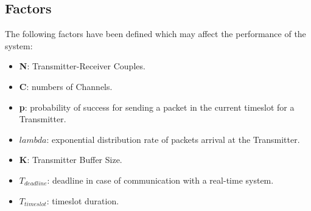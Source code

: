 \subsection{Factors}
The following factors have been defined which may affect the performance of the system:
\begin{itemize}
	\item \textbf{N}: Transmitter-Receiver Couples.
	\item \textbf{C}: numbers of Channels.
	\item \textbf{p}: probability of success for sending a packet in the current timeslot for a Transmitter.
	\item \textbf{$lambda$}: exponential distribution rate of packets arrival at the Transmitter.
	\item \textbf{K}: Transmitter Buffer Size.
	\item $T_{deadline}$: deadline in case of communication with a real-time system.
	\item $T_{timeslot}$: timeslot duration. 
\end{itemize}